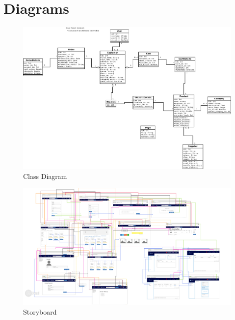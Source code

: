 \documentclass{report}
\begin{document}
\chapter{Diagrams}
\label{chap:Diagrams}
\begin{figure}[h!]
\includegraphics[width=\linewidth]{Diagrams/ClassDiagram.png}
\caption{Class Diagram}
\label{fig:ClassDiagram}
\end{figure}

\begin{figure}[h!]
\includegraphics[width=\linewidth]{Diagrams/storyboard.png}
\caption{Storyboard}
\label{fig:Storyboard}
\end{figure}
\end{document}
